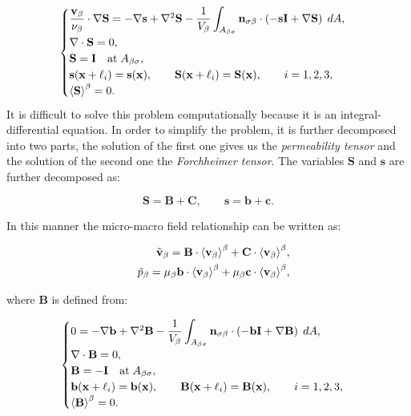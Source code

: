 \begin{eqnarray}
	\begin{cases}
		\dfrac{\textbf{v}_{\beta}}{\nu_{\beta}} \cdot  \nabla \mathbf{S} = -\nabla \mathbf{s} + \nabla^2 \mathbf{S} - \dfrac{1}{V_\beta} \displaystyle \int_{A_{\beta \sigma}} \mathbf{n}_{\sigma \beta}  \cdot \left(-\mathbf{s}\mathbf{I}  +  \nabla \mathbf{S} \right)  \;dA,  \\
		\nabla \cdot \mathbf{S} = 0, \\
		\mathbf{S} = \mathbf{I} \quad \textrm{at} \; A_{\beta \sigma}, \\
		\mathbf{s}(\mathbf{x} +\ell_i) = \mathbf{s}(\mathbf{x}), \qquad \mathbf{S}(\mathbf{x} +\ell_i) = \mathbf{S}(\mathbf{x}), \qquad i=1,2,3 ,\\
		{\left< \mathbf{S} \right>}^{\beta} = 0.
	\end{cases}
\label{eq:R_problem}
\end{eqnarray}
It is difficult to solve this problem computationally because it is an integral-differential equation.
In order to simplify the problem, it is further decomposed into two parts, the solution of the first one gives us the \textit{permeability tensor} and the solution of the second one the \textit{Forchheimer tensor}. The variables $\mathbf{S}$ and $\mathbf{s}$ are further decomposed as:

$$
 \mathbf{S} = \mathbf{B} + \mathbf{C}, \qquad \mathbf{s} = \mathbf{b} + \mathbf{c}.
$$

\noindent In this manner the micro-macro field relationship can be written as:

\begin{eqnarray}
	&& \tilde{\textbf{v}}_{\beta} = \mathbf{B} \cdot {\left< \textbf{v}_{\beta}\right>}^{\beta} + \mathbf{C} \cdot {\left< \textbf{v}_{\beta}\right>}^{\beta},  	\label{eq:closure_viab_divison} \\
	&& \tilde{p}_{\beta} = \mu_{\beta} \mathbf{b} \cdot {\left< \textbf{v}_{\beta}\right>}^{\beta} + \mu_{\beta} \mathbf{c} \cdot {\left< \textbf{v}_{\beta}\right>}^{\beta}, \label{eq:closure_viab_hp}
\end{eqnarray}

where $\mathbf{B}$ is defined from:

\begin{eqnarray}
	\begin{cases}
		0 = -\nabla \mathbf{b} + \nabla^2 \mathbf{B} - \dfrac{1}{V_\beta} \displaystyle \int_{A_{\beta \sigma}} \mathbf{n}_{\sigma \beta}  \cdot \left(-\mathbf{b}\mathbf{I}  +  \nabla \mathbf{B} \right)  \;dA,  \\
		\nabla \cdot \mathbf{B} = 0,  \\
		\mathbf{B} = -\mathbf{I} \quad \textrm{at} \; A_{\beta \sigma}, \\
		\mathbf{b}(\mathbf{x} +\ell_i) = \mathbf{b}(\mathbf{x}), \qquad \mathbf{B}(\mathbf{x} +\ell_i) = \mathbf{B}(\mathbf{x}), \qquad i=1,2,3 , \\
		{\left< \mathbf{B} \right>}^{\beta} = 0.
	\end{cases}
\label{eq:B_problem}
\end{eqnarray}


